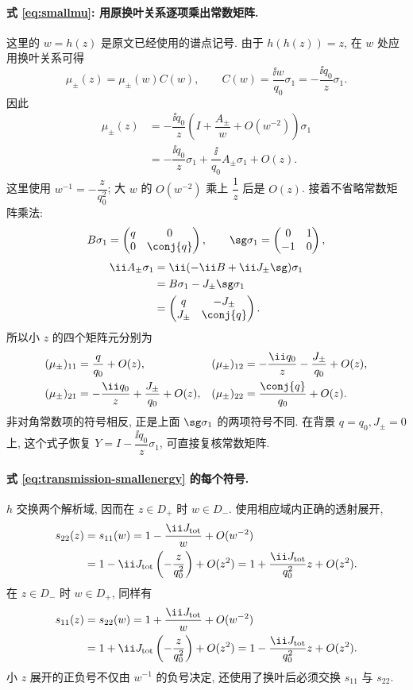 \paragraph{式 \eqref{eq:smallmu}: 用原换叶关系逐项乘出常数矩阵.}
这里的 $w=h(z)$ 是原文已经使用的谱点记号.
由于 $h(h(z))=z$, 在 $w$ 处应用换叶关系可得
\[
\mu_\pm(z)=\mu_\pm(w)C(w),
\qquad
C(w)=\dfrac{\ii w}{q_0}\sigma_1
=-\dfrac{\ii q_0}{z}\sigma_1.
\]
因此
\begin{align*}
\mu_\pm(z)
&=-\dfrac{\ii q_0}{z}
\left(I+\dfrac{A_\pm}{w}+O(w^{-2})\right)\sigma_1\\
&=-\dfrac{\ii q_0}{z}\sigma_1
+\dfrac{\ii}{q_0}A_\pm\sigma_1+O(z).
\end{align*}
这里使用 $w^{-1}=-\dfrac{z}{q_0^2}$;
大 $w$ 的 $O(w^{-2})$ 乘上 $\dfrac{1}{z}$ 后是 $O(z)$.
接着不省略常数矩阵乘法:
\[
B\sigma_1=\begin{pmatrix}q&0\\0&\conj{q}\end{pmatrix},
\qquad
\sg\sigma_1=\begin{pmatrix}0&1\\-1&0\end{pmatrix},
\]
\begin{align*}
\ii A_\pm\sigma_1
&=\ii(-\ii B+\ii J_\pm\sg)\sigma_1\\
&=B\sigma_1-J_\pm\sg\sigma_1\\
&=\begin{pmatrix}q&-J_\pm\\J_\pm&\conj{q}\end{pmatrix}.
\end{align*}
所以小 $z$ 的四个矩阵元分别为
\begin{align*}
(\mu_\pm)_{11}&=\dfrac{q}{q_0}+O(z),&
(\mu_\pm)_{12}&=-\dfrac{\ii q_0}{z}-\dfrac{J_\pm}{q_0}+O(z),\\
(\mu_\pm)_{21}&=-\dfrac{\ii q_0}{z}+\dfrac{J_\pm}{q_0}+O(z),&
(\mu_\pm)_{22}&=\dfrac{\conj{q}}{q_0}+O(z).
\end{align*}
非对角常数项的符号相反, 正是上面 $\sg\sigma_1$ 的两项符号不同.
在背景 $q=q_0,J_\pm=0$ 上, 这个式子恢复
$Y=I-\dfrac{\ii q_0}{z}\sigma_1$, 可直接复核常数矩阵.

\paragraph{式 \eqref{eq:transmission-smallenergy} 的每个符号.}
$h$ 交换两个解析域, 因而在 $z\in D_+$ 时 $w\in D_-$.
使用相应域内正确的透射展开,
\begin{align*}
s_{22}(z)
&=s_{11}(w)
=1-\dfrac{\ii J_{\rm tot}}{w}+O(w^{-2})\\
&=1-\ii J_{\rm tot}\left(-\dfrac{z}{q_0^2}\right)+O(z^2)
=1+\dfrac{\ii J_{\rm tot}}{q_0^2}z+O(z^2).
\end{align*}
在 $z\in D_-$ 时 $w\in D_+$, 同样有
\begin{align*}
s_{11}(z)
&=s_{22}(w)
=1+\dfrac{\ii J_{\rm tot}}{w}+O(w^{-2})\\
&=1+\ii J_{\rm tot}\left(-\dfrac{z}{q_0^2}\right)+O(z^2)
=1-\dfrac{\ii J_{\rm tot}}{q_0^2}z+O(z^2).
\end{align*}
小 $z$ 展开的正负号不仅由 $w^{-1}$ 的负号决定,
还使用了换叶后必须交换 $s_{11}$ 与 $s_{22}$.


